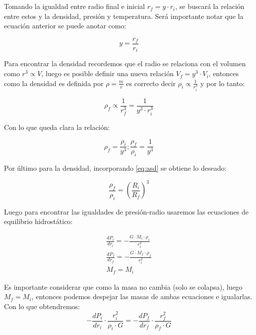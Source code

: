 \documentclass[2pt]{article}
\begin{document}
\section{}

Tomando la igualdad entre radio final e inicial $r_f=y\cdot r_i$, se buscará la relación entre estos y la densidad, presión y temperatura. Será importante notar que la ecuación anterior se puede anotar como:

\begin{equation}\label{eq:asd}
y=\frac{r_f}{r_i}
\end{equation}

Para encontrar la densidad recordemos que el radio se relaciona con el volumen como $r^{3}  \propto V$, luego es posible definir una nueva relación $V_{f}=y^3\cdot V_i$, entonces como la densidad es definida por $\rho = \frac{m}{v}$ es correcto decir $\rho_i \propto \frac{1}{r^3_i}$ y por lo tanto:

\begin{equation}
\rho_f \propto \frac{1}{r^3_f} = \frac{1}{y^3\cdot r^3_i}
\end{equation}

Con lo que queda clara la relación:

\begin{equation}
\rho_f=\frac{\rho_i}{y^3} ; \frac{\rho_f}{\rho_i}=\frac{1}{y^3}
\end{equation}

Por último para la densidad, incorporando \ref{eq:asd} se obtiene lo deseado:

\begin{equation}
\frac{\rho_f}{\rho_i}=(\frac{R_i}{R_f})^3
\end{equation}


Luego para encontrar las igualdades de presión-radio usaremos las ecuaciones de equilibrio hidrostático:



\begin{subequations}\label{ayy}
\begin{align}
        \frac{dP_i}{dr_i}=- \frac{G\cdot M_i \cdot \rho_i}{r^2_i}     \\
        \frac{dP_f}{dr_f}=- \frac{G\cdot M_f \cdot \rho_f}{r^2_i} \\
        M_f=M_i
\end{align}
\end{subequations}

Es importante considerar que como la masa no cambia (solo se colapsa), luego $M_f=M_i$, entonces podemos despejar las masas de ambas ecuaciones e igualarlas. Con lo que obtendremos:
\begin{equation}
-\frac{dP_i}{dr_i}\cdot \frac{r^2_i}{\rho_i \cdot G} = -\frac{dP_f}{dr_f}\cdot \frac{r^2_f}{\rho_f \cdot G}
\end{equation}
\end{document}
